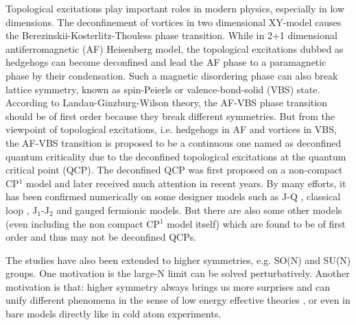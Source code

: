 \documentclass[twocolumn,superscriptaddress]{revtex4-1}
\begin{document}
Topological excitations play important roles in modern physics, especially in low dimensions. The deconfinement of vortices in two dimensional XY-model causes the Berezinskii-Kosterlitz-Thouless phase transition. \cite{Kosterlitz1973} While in 2+1 dimensional antiferromagnetic (AF) Heisenberg model, the topological excitations dubbed as hedgehogs can become deconfined and lead the AF phase to a paramagnetic phase by their condensation. \cite{Haldane1988a} Such a magnetic disordering phase can also break lattice symmetry, known as spin-Peierls or valence-bond-solid (VBS) state. \cite{Read1989b,*Read1989a,*Read1990} According to Landau-Ginzburg-Wilson theory, the AF-VBS phase transition should be of first order because they break different symmetries. But from the viewpoint of topological excitations, i.e. hedgehogs in AF and vortices in VBS, the AF-VBS transition is proposed to be a continuous one named as deconfined quantum criticality due to the deconfined topological excitations at the quantum critical point (QCP). \cite{Senthil2004,*Senthil2004a,*Levin2004} The deconfined QCP was first proposed on a non-compact CP$^1$ model and later received much attention in recent years. By many efforts, it has been confirmed numerically on some designer models such as J-Q \cite{Sandvik2007,Melko2008,Sandvik2010,Pujari2013,Shao2016}, classical loop \cite{Nahum2015}, J$_1$-J$_2$ \cite{Wang2016d} and gauged fermionic \cite{Assaad2016} models. But there are also some other models \cite{Kragset2006,Kuklov2006,Sen2010,Papanikolaou2010} (even including the non compact CP$^1$ model itself\cite{Kuklov2008}) which are found to be of first order and thus may not be deconfined QCPs. 

The studies have also been extended to higher symmetries, e.g. SO(N)\cite{Kaul2015} and SU(N)
groups\cite{Lou2009,Kaul2012a,Kaul2012,Block2013,D'Emidio2016,D'Emidio2017}. One motivation is the large-N limit can be solved perturbatively. \cite{Affleck1988a,Marston1989,Arovas1988,Read1989b,*Read1989a,*Read1990,Auerbach2011} Another motivation is that: higher symmetry always brings us more surprises and can unify different phenomena in the sense of low energy effective theories \cite{Hooft2005,Zhang1997,Volovik2003,Hayward2014,Nahum2015a}, or even in bare models directly like in cold atom experiments. \cite{Wu2003,*Wu2006a,DeSalvo2010,Taie2010,Krauser2012,Taie2012,Zhang2014,Cazalilla2014,Laflamme2016} 


%
\end{document}
